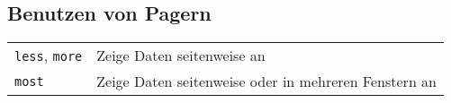 \documentclass[10pt,a4paper]{article}
\begin{document}
\begin{multicols}{2}
\section{Benutzen von Pagern}
\begin{tabular}{ p{2.5cm} p{8.5cm} }
  \hline
  \texttt{less}, \texttt{more} & Zeige Daten seitenweise an \\
  \rowcolor{Gray}
  \texttt{most} & Zeige Daten seitenweise oder in mehreren Fenstern an \\
  \hline
\end{tabular}




\end{multicols}

\newpage

\cheatsheet
\end{document}
